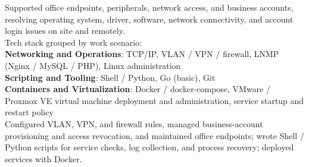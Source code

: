 
\begin{cvparagraph}

Supported office endpoints, peripherals, network access, and business accounts, resolving operating system, driver, software, network connectivity, and account login issues on site and remotely.\\
Tech stack grouped by work scenario:\\
\textbf{Networking and Operations}: TCP/IP, VLAN / VPN / firewall, LNMP (Nginx / MySQL / PHP), Linux administration\\
\textbf{Scripting and Tooling}: Shell / Python, Go (basic), Git\\
\textbf{Containers and Virtualization}: Docker / docker-compose, VMware / Proxmox VE virtual machine deployment and administration, service startup and restart policy\\
Configured VLAN, VPN, and firewall rules, managed business-account provisioning and access revocation, and maintained office endpoints; wrote Shell / Python scripts for service checks, log collection, and process recovery; deployed services with Docker.
\end{cvparagraph}
